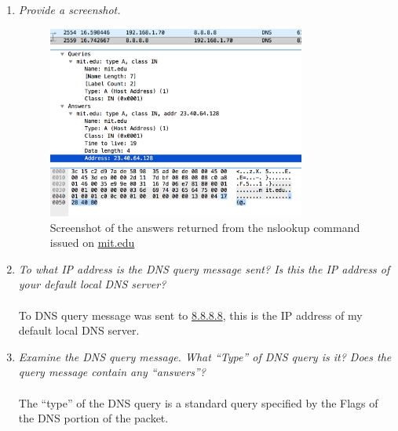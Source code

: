 \documentclass[12pt]{article}
\begin{document}
\begin{enumerate}
	\item{\textit{Provide a screenshot.}}
		\begin{figure}[H]
			\centering
			\includegraphics[width=0.80\textwidth,center]{15}%
			\caption{Screenshot of the answers returned from the nslookup command issued on \url{mit.edu}}
		\end{figure}

	\item{\textit{To what IP address is the DNS query message sent? Is this the IP address of your default local DNS server?}}\\ \\ 
		To DNS query message was sent to \url{8.8.8.8}, this is the IP address of my default local DNS server.

	\item{\textit{Examine the DNS query message. What “Type” of DNS query is it? Does the query message contain any “answers”?}}\\ \\
		The ``type'' of the DNS query is a standard query specified by the Flags of the DNS portion of the packet.


\end{enumerate}
\end{document}
